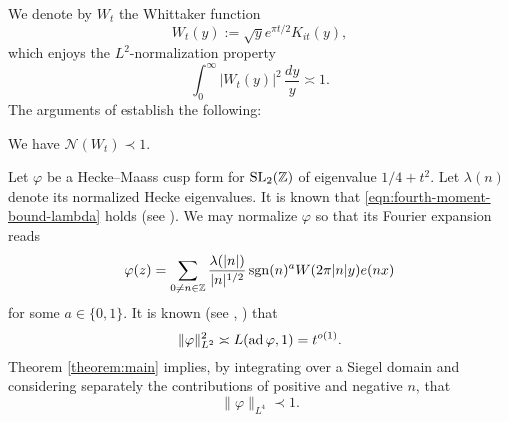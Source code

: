 \documentclass[reqno]{amsart} 
\begin{document}
We denote by $W_t$ the Whittaker function
\begin{equation*}
  W_t(y) := \sqrt{y} e ^{\pi t / 2} K _{i t} (y),
\end{equation*}
which enjoys the $L^2$-normalization property
\begin{equation*}
  \int _0 ^\infty \lvert W_t(y) \rvert ^2 \, \frac{d y}{y} \asymp 1.
\end{equation*}
The arguments of \cite[Theorem 2]{ki20234} establish the following:
\begin{theorem}\label{theorem:main}
  We have $\mathcal{N}(W_t) \prec 1$.
\end{theorem}

\begin{example}\label{example:cqx50a0rbu}
  Let $\varphi$ be a Hecke--Maass cusp form for $\operatorname{SL}_2(\mathbb{Z})$ of eigenvalue $1/4 + t^2$. Let $\lambda(n)$ denote its normalized Hecke eigenvalues.  It is known  that \eqref{eqn:fourth-moment-bound-lambda} holds (see \cite[Lemma 3.6]{MR3102912}).  We may normalize $\varphi$ so that its Fourier expansion reads
  \begin{equation*}
    \varphi(z) = \sum _{0 \neq n \in \mathbb{Z} }
    \frac{\lambda(|n|)}{|n|^{1/2}}
    \operatorname{sgn}(n)^{a} W (2 \pi |n| y) e (n x)
  \end{equation*}
  for some $a \in \{0,1\}$.  It is known (see \cite{MR1067982}, \cite{HL94}) that
  \begin{equation*}
    \lVert \varphi  \rVert ^2 _{L^2} \asymp L(\operatorname{ad} \varphi, 1) = t^{o(1)}.
  \end{equation*}
  Theorem \ref{theorem:main} implies, by integrating over a Siegel domain and considering separately the contributions of positive and negative $n$, that
  \begin{equation*}
    \lVert \varphi  \rVert _{L^4} \prec 1.
  \end{equation*}
\end{example}
\end{document}
